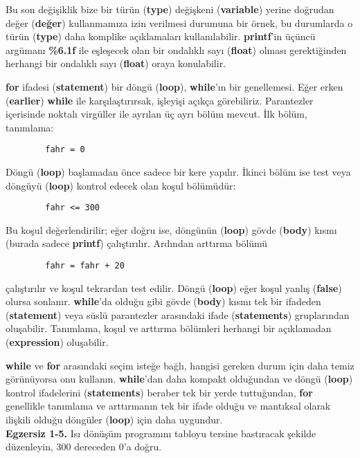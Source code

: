 \documentclass[a4paper,12pt,oneside]{book}
\begin{document}
\par Bu son değişiklik bize bir türün (\textbf{type}) değişkeni (\textbf{variable}) yerine doğrudan değer (\textbf{değer}) kullanmamıza izin verilmesi durumuna bir örnek, bu durumlarda o türün (\textbf{type}) daha komplike açıklamaları kullanılabilir. \textbf{printf}'in üçüncü argümanı \textbf{\%6.1f} ile eşleşecek olan bir ondalıklı sayı (\textbf{float}) olması gerektiğinden herhangi bir ondalıklı sayı (\textbf{float}) oraya konulabilir.
\par \textbf{for} ifadesi (\textbf{statement}) bir döngü (\textbf{loop}), \textbf{while}'ın bir genellemesi. Eğer erken (\textbf{earlier}) \textbf{while} ile karşılaştırırsak, işleyişi açıkça görebiliriz. Parantezler içerisinde noktalı virgüller ile ayrılan üç ayrı bölüm mevcut. İlk bölüm, tanımlama:
\begin{lstlisting}
		fahr = 0
\end{lstlisting}
Döngü (\textbf{loop}) başlamadan önce sadece bir kere yapılır. İkinci bölüm ise test veya döngüyü (\textbf{loop}) kontrol edecek olan koşul bölümüdür:
\begin{lstlisting}
		fahr <= 300
\end{lstlisting}
Bu koşul değerlendirilir; eğer doğru ise, döngünün (\textbf{loop}) gövde (\textbf{body}) kısmı (burada sadece \textbf{printf}) çalıştırılır. Ardından arttırma bölümü
\begin{lstlisting}
		fahr = fahr + 20
\end{lstlisting}
çalıştırılır ve koşul tekrardan test edilir. Döngü (\textbf{loop}) eğer koşul yanlış (\textbf{false}) olursa sonlanır. \textbf{while}'da olduğu gibi gövde (\textbf{body}) kısmı tek bir ifadeden (\textbf{statement}) veya süslü parantezler arasındaki ifade (\textbf{statements}) gruplarından oluşabilir. Tanımlama, koşul ve arttırma bölümleri herhangi bir açıklamadan (\textbf{expression}) oluşabilir.
\par \textbf{while} ve \textbf{for} arasındaki seçim isteğe bağlı, hangisi gereken durum için daha temiz görünüyorsa onu kullanın. \textbf{while}'dan daha kompakt olduğundan ve döngü (\textbf{loop}) kontrol ifadelerini (\textbf{statements}) beraber tek bir yerde tuttuğundan, \textbf{for} genellikle tanımlama ve arttırmanın tek bir ifade olduğu ve mantıksal olarak ilişkili olduğu döngüler (\textbf{loop}) için daha uygundur. \newline
\\ \noindent \textbf{Egzersiz 1-5.} Isı dönüşüm programını tabloyu tersine bastıracak şekilde düzenleyin, 300 dereceden 0'a doğru. \pagebreak
\end{document}
